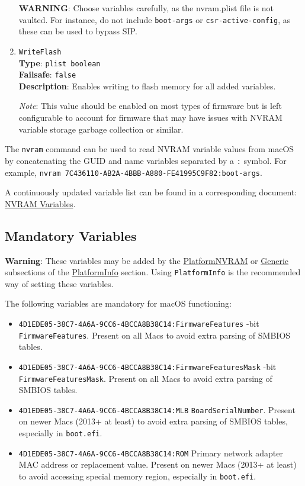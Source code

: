 \documentclass[]{article}
\makeatletter
\providecommand{\tightlist}{%
  \setlength{\itemsep}{0pt}\setlength{\parskip}{0pt}}
\renewcommand{\label}[1]{%
\zref@wrapper@immediate{\oldlabel{#1}}}  %
\makeatother
\begin{document}
\begin{enumerate}
  \textbf{WARNING}: Choose variables carefully, as the nvram.plist file is not vaulted.
  For instance, do not include \texttt{boot-args} or \texttt{csr-active-config}, as
  these can be used to bypass SIP.

\item
  \texttt{WriteFlash}\\
  \textbf{Type}: \texttt{plist\ boolean}\\
  \textbf{Failsafe}: \texttt{false}\\
  \textbf{Description}: Enables writing to flash memory for all added variables.

  \emph{Note}: This value should be enabled on most types of firmware but is
  left configurable to account for firmware that may have issues with NVRAM
  variable storage garbage collection or similar.

\end{enumerate}

The \texttt{nvram} command can be used to read NVRAM variable values from macOS
by concatenating the GUID and name variables separated by a \texttt{:} symbol.
For example, \texttt{nvram 7C436110-AB2A-4BBB-A880-FE41995C9F82:boot-args}.

A continuously updated variable list can be found in a corresponding document:
\href{https://docs.google.com/spreadsheets/d/1HTCBwfOBkXsHiK7os3b2CUc6k68axdJYdGl-TyXqLu0}{NVRAM Variables}.

\subsection{Mandatory Variables}\label{nvramvars}

\textbf{Warning}: These variables may be added by the
\hyperref[platforminfonvram]{PlatformNVRAM} or
\hyperref[platforminfogeneric]{Generic} subsections of the
\hyperref[platforminfo]{PlatformInfo} section.
Using \texttt{PlatformInfo} is the recommended way of setting these variables.

The following variables are mandatory for macOS functioning:

\begin{itemize}
\tightlist
\item
  \texttt{4D1EDE05-38C7-4A6A-9CC6-4BCCA8B38C14:FirmwareFeatures}
  -bit \texttt{FirmwareFeatures}. Present on all Macs to avoid extra parsing of SMBIOS tables.
\item
  \texttt{4D1EDE05-38C7-4A6A-9CC6-4BCCA8B38C14:FirmwareFeaturesMask}
  -bit \texttt{FirmwareFeaturesMask}. Present on all Macs to avoid extra parsing
  of SMBIOS tables.
\item
  \texttt{4D1EDE05-38C7-4A6A-9CC6-4BCCA8B38C14:MLB}
  \break
  \texttt{BoardSerialNumber}. Present on newer Macs (2013+ at least) to avoid extra parsing
  of SMBIOS tables, especially in \texttt{boot.efi}.
\item
  \texttt{4D1EDE05-38C7-4A6A-9CC6-4BCCA8B38C14:ROM}
  \break
  Primary network adapter MAC address or replacement value. Present on newer Macs
  (2013+ at least) to avoid accessing special memory region, especially in \texttt{boot.efi}.
\end{itemize}
\end{document}
